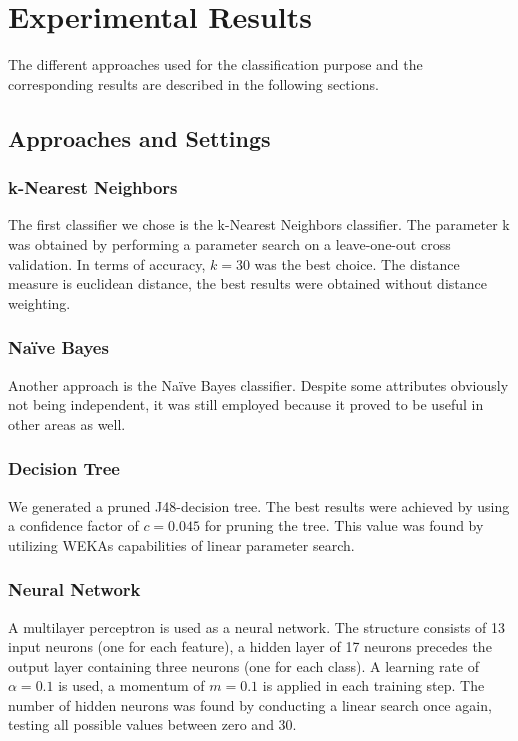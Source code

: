 \section{Experimental Results}
The different approaches used for the classification purpose and the corresponding results are described in the following sections. 
\subsection{Approaches and Settings}

\subsubsection*{k-Nearest Neighbors}
The first classifier we chose is the k-Nearest Neighbors classifier. The
parameter k was obtained by performing a parameter search on a
leave-one-out cross validation. In terms of accuracy, \(k=30\) was
the best choice. The distance measure is euclidean distance, the best
results were obtained without distance weighting.

\subsubsection*{Na\"ive Bayes}
Another approach is the Na\"ive Bayes classifier. Despite some
attributes obviously not being independent, it was still employed
because it proved to be useful in other areas as well.

\subsubsection*{Decision Tree}
We generated a pruned J48-decision tree. The best results were
achieved by using a confidence factor of \(c=0.045\) for pruning the
tree. This value was found by utilizing WEKAs capabilities of linear
parameter search.

\subsubsection*{Neural Network}
A multilayer perceptron is used as a neural network. The structure
consists of 13 input neurons (one for each feature), a hidden layer
of 17 neurons precedes the output layer containing three neurons
(one for each class). A learning rate of \(\alpha=0.1\) is used, a momentum of
\(m=0.1\) is applied in each training step. The number of hidden
neurons was found by conducting a linear search once again, testing
all possible values between zero and 30.

